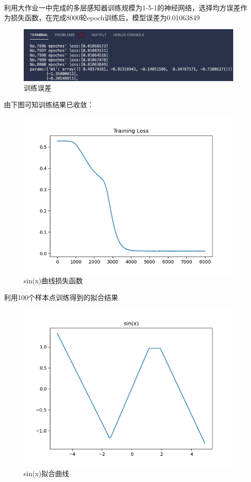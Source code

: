 \documentclass{article}
\begin{document}
\section{}
利用大作业一中完成的多层感知器训练规模为1-5-1的神经网络，选择均方误差作为损失函数，在完成8000轮epoch训练后，模型误差为0.01063849
\begin{figure}[H]
	\centering
	\includegraphics[scale=0.6]{loss.png}
	\caption{训练误差}
\end{figure}
由下图可知训练结果已收敛：
\begin{figure}[H]
	\centering
	\includegraphics[scale=0.6]{code/sin_loss.png}
	\caption{sin(x)曲线损失函数}
\end{figure}
利用100个样本点训练得到的拟合结果
\begin{figure}[H]
	\centering
	\includegraphics[scale=0.6]{code/sin.png}
	\caption{sin(x)拟合曲线}
\end{figure}
\end{document}
